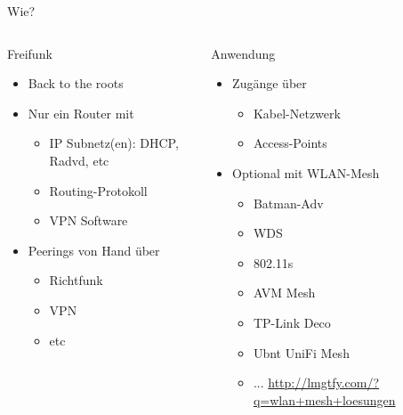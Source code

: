 \begin{frame}{Wie?}
    \begin{columns}[T]
        \begin{column}{0.46\textwidth}
            {\Large{}Freifunk}
            \begin{itemize}
                \item Back to the roots
                \item Nur ein Router mit
                \begin{itemize}
                    \item IP Subnetz(en): DHCP, Radvd, etc
                    \item Routing-Protokoll
                    \item VPN Software
                \end{itemize}
                \item Peerings von Hand über
                \begin{itemize}
                    \item Richtfunk
                    \item VPN
                    \item etc
                \end{itemize}
            \end{itemize}
        \end{column}
        \begin{column}{0.46\textwidth}
            {\Large{}Anwendung}
            \begin{itemize}
                \item Zugänge über
                \begin{itemize}
                    \item Kabel-Netzwerk
                    \item Access-Points
                \end{itemize}
                \item Optional mit \glqq{}WLAN-Mesh\grqq{}
                \begin{itemize}
                    \item Batman-Adv
                    \item WDS
                    \item 802.11s
                    \item AVM Mesh
                    \item TP-Link Deco
                    \item Ubnt UniFi Mesh
                    \item ... \url{http://lmgtfy.com/?q=wlan+mesh+loesungen}
                \end{itemize}
            \end{itemize}
        \end{column}
    \end{columns}
\end{frame}

